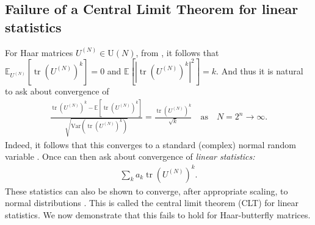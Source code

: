 \documentclass{amsart}
\theoremstyle{definition}
\theoremstyle{remark}
\numberwithin{equation}{section}
\DeclareMathOperator{\tr}{tr}
\begin{document}
\subsection{Failure of a Central Limit Theorem for linear statistics}

For Haar matrices $U^{(N)} \in \mathrm{U}(N)$, from \cite{Diaconis1994,Diaconis2001}, it follows that $\mathbb E_{U^{(N)}}\left[\tr \left( U^{(N)} \right)^k \right] = 0$ and $\mathbb E \left[ \left| \tr \left( U^{(N)} \right)^k \right|^2 \right] = k$.  And thus it is natural to ask about convergence of
\begin{align}
  \frac{\tr (U^{(N)})^k - \mathbb E\left[\tr \left( U^{(N)} \right)^k \right]}{\sqrt{\mathrm{Var}\left( \tr (U^{(N)})^k \right)}} = \frac{\tr (U^{(N)})^k}{\sqrt{k}}  \quad \text{as} \quad N = 2^n \to \infty.
\end{align}
Indeed, it follows that this converges to a standard (complex) normal random variable \cite{Diaconis2001}.  Once can then ask about convergence of \emph{linear statistics:}
\begin{align}
  \sum_k a_k \tr (U^{(N)})^k.
\end{align}
These statistics can also be shown to converge, after appropriate scaling, to normal distributions \cite{Diaconis2001}.  This is called the central limit theorem (CLT) for linear statistics.  We now demonstrate that this fails to hold for Haar-butterfly matrices.
\end{document}
